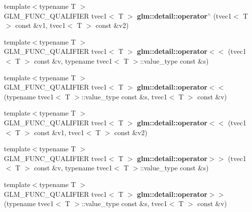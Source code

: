 \begin{DoxyCompactItemize}
\item 
\hypertarget{namespaceglm_1_1detail_a08d05d54da1a8f9cd0c1dfc620d24540}{}{\footnotesize template$<$typename T $>$ }\\G\+L\+M\+\_\+\+F\+U\+N\+C\+\_\+\+Q\+U\+A\+L\+I\+F\+I\+E\+R tvec1$<$ T $>$ {\bfseries glm\+::detail\+::operator$^\wedge$} (tvec1$<$ T $>$ const \&v1, tvec1$<$ T $>$ const \&v2)\label{namespaceglm_1_1detail_a08d05d54da1a8f9cd0c1dfc620d24540}

\item 
\hypertarget{namespaceglm_1_1detail_a1b2401f17739acc84c535021545748b5}{}{\footnotesize template$<$typename T $>$ }\\G\+L\+M\+\_\+\+F\+U\+N\+C\+\_\+\+Q\+U\+A\+L\+I\+F\+I\+E\+R tvec1$<$ T $>$ {\bfseries glm\+::detail\+::operator$<$$<$} (tvec1$<$ T $>$ const \&v, typename tvec1$<$ T $>$\+::value\+\_\+type const \&s)\label{namespaceglm_1_1detail_a1b2401f17739acc84c535021545748b5}

\item 
\hypertarget{namespaceglm_1_1detail_a9160216c3c05c934418e4682a8cf71dc}{}{\footnotesize template$<$typename T $>$ }\\G\+L\+M\+\_\+\+F\+U\+N\+C\+\_\+\+Q\+U\+A\+L\+I\+F\+I\+E\+R tvec1$<$ T $>$ {\bfseries glm\+::detail\+::operator$<$$<$} (typename tvec1$<$ T $>$\+::value\+\_\+type const \&s, tvec1$<$ T $>$ const \&v)\label{namespaceglm_1_1detail_a9160216c3c05c934418e4682a8cf71dc}

\item 
\hypertarget{namespaceglm_1_1detail_a795144a1721352dd8ec35087e0cb9ff4}{}{\footnotesize template$<$typename T $>$ }\\G\+L\+M\+\_\+\+F\+U\+N\+C\+\_\+\+Q\+U\+A\+L\+I\+F\+I\+E\+R tvec1$<$ T $>$ {\bfseries glm\+::detail\+::operator$<$$<$} (tvec1$<$ T $>$ const \&v1, tvec1$<$ T $>$ const \&v2)\label{namespaceglm_1_1detail_a795144a1721352dd8ec35087e0cb9ff4}

\item 
\hypertarget{namespaceglm_1_1detail_ad6c1e015a661e377bbc6dd97543d44fe}{}{\footnotesize template$<$typename T $>$ }\\G\+L\+M\+\_\+\+F\+U\+N\+C\+\_\+\+Q\+U\+A\+L\+I\+F\+I\+E\+R tvec1$<$ T $>$ {\bfseries glm\+::detail\+::operator$>$$>$} (tvec1$<$ T $>$ const \&v, typename tvec1$<$ T $>$\+::value\+\_\+type const \&s)\label{namespaceglm_1_1detail_ad6c1e015a661e377bbc6dd97543d44fe}

\item 
\hypertarget{namespaceglm_1_1detail_abe562021ea02757230c507dcec64e280}{}{\footnotesize template$<$typename T $>$ }\\G\+L\+M\+\_\+\+F\+U\+N\+C\+\_\+\+Q\+U\+A\+L\+I\+F\+I\+E\+R tvec1$<$ T $>$ {\bfseries glm\+::detail\+::operator$>$$>$} (typename tvec1$<$ T $>$\+::value\+\_\+type const \&s, tvec1$<$ T $>$ const \&v)\label{namespaceglm_1_1detail_abe562021ea02757230c507dcec64e280}


\end{DoxyCompactItemize}

